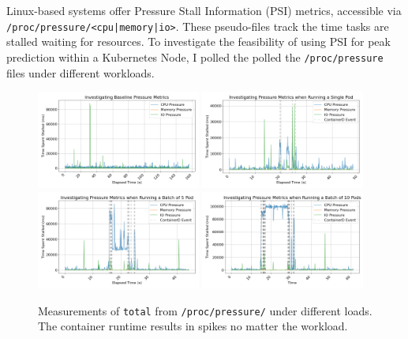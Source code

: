 Linux-based systems offer Pressure Stall Information (PSI) metrics, accessible
via \texttt{/proc/pressure/<cpu|memory|io>}. These pseudo-files track the time
tasks are stalled waiting for resources. To investigate the feasibility of using
PSI for peak prediction within a Kubernetes Node, I polled the polled the
\verb|/proc/pressure| files under different workloads.

\begin{figure}[ht]
    \centering
    \includegraphics[width=0.48\textwidth]{images/pressure-baseline.png}
    \includegraphics[width=0.48\textwidth]{images/pressure-single.png} \\
    \includegraphics[width=0.48\textwidth]{images/pressure-smallbatch.png}
    \includegraphics[width=0.48\textwidth]{images/pressure-bigbatch.png}
    \caption{Measurements of \texttt{total} from \texttt{/proc/pressure/} under
    different loads. The container runtime results in spikes no matter the
    workload.}
    \label{fig:pressure}
\end{figure}

